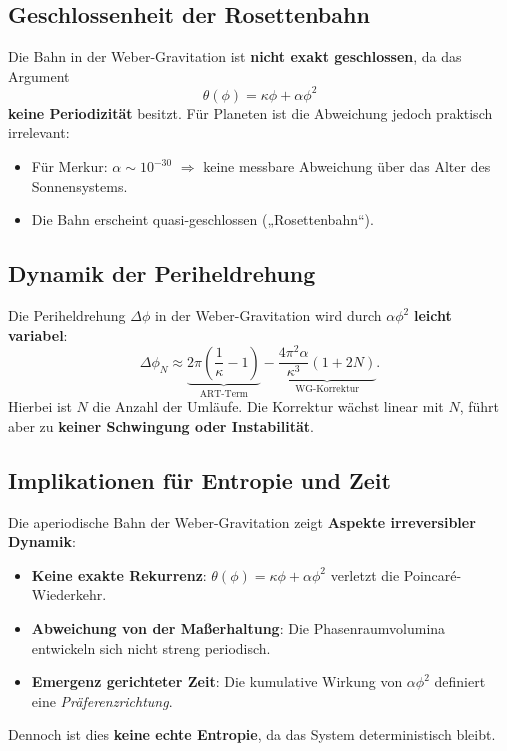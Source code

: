 \subsection{Geschlossenheit der Rosettenbahn}
Die Bahn in der Weber-Gravitation ist \textbf{nicht exakt geschlossen}, da das Argument
\begin{equation}
\theta(\phi) = \kappa\phi + \alpha \phi^2
\end{equation}
\textbf{keine Periodizität} besitzt. Für Planeten ist die Abweichung jedoch praktisch irrelevant:
\begin{itemize}
\item Für Merkur: $\alpha \sim 10^{-30}$ $\Rightarrow$ keine messbare Abweichung über das Alter des Sonnensystems.
\item Die Bahn erscheint quasi-geschlossen („Rosettenbahn“).
\end{itemize}

\subsection{Dynamik der Periheldrehung}
Die Periheldrehung $\Delta\phi$ in der Weber-Gravitation wird durch $\alpha \phi^2$ \textbf{leicht variabel}:
\begin{equation}
\Delta\phi_N \approx \underbrace{2\pi\left(\frac{1}{\kappa} - 1\right)}_{\text{ART-Term}} - \underbrace{\frac{4\pi^2 \alpha}{\kappa^3}(1 + 2N)}_{\text{WG-Korrektur}}.
\end{equation}
Hierbei ist $N$ die Anzahl der Umläufe. Die Korrektur wächst linear mit $N$, führt aber zu \textbf{keiner Schwingung oder Instabilität}.

\subsection{Implikationen für Entropie und Zeit}
Die aperiodische Bahn der Weber-Gravitation zeigt \textbf{Aspekte irreversibler Dynamik}:
\begin{itemize}
\item \textbf{Keine exakte Rekurrenz}: $\theta(\phi) = \kappa\phi + \alpha \phi^2$ verletzt die Poincaré-Wiederkehr.
\item \textbf{Abweichung von der Maßerhaltung}: Die Phasenraumvolumina entwickeln sich nicht streng periodisch.
\item \textbf{Emergenz gerichteter Zeit}: Die kumulative Wirkung von $\alpha \phi^2$ definiert eine \textit{Präferenzrichtung}.
\end{itemize}
Dennoch ist dies \textbf{keine echte Entropie}, da das System deterministisch bleibt.

